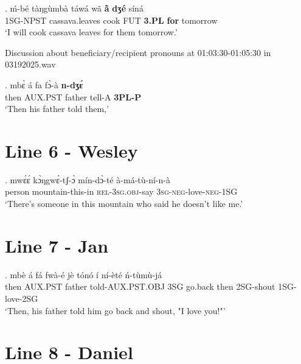 \documentclass{assets/fieldnotes}
\begin{document}
\exg.
ḿ-bé    tàŋgùmbà         táwá   wã    \textbf{à̃ }     \textbf{dʒé}    síná     \\
1SG-NPST   cassava.leaves   cook   FUT   \textbf{3.PL}   \textbf{for}   tomorrow \\
`I will cook cassava leaves for them tomorrow.' \label{3PL beneficiary 2}

Discussion about beneficiary/recipient pronouns at 01:03:30-01:05:30 in 03192025.wav

\exg.
mbɛ̀    á     fa       fɔ̀-à     \textbf{n-dʒɛ́ }\\
then   AUX.PST   father   tell-A   \textbf{3PL-P}  \\%
`Then his father told them,' \label{told them}


\section{Line 6 - Wesley} 

\exg. mwɛ́ɛ́ kɔ̀ŋgwɛ́-tʃ-ɔ̀ mín-dɔ̀-té à-má-tù-ní-n-à\\
person mountain-this-in \textsc{rel}-\textsc{3sg.obj}-say \textsc{3sg}-\textsc{neg}-love-\textsc{neg}-\textsc{1SG}\\
`There's someone in this mountain who said he doesn't like me.'


\section{Line 7 - Jan} 

\exg. mbè á fá fwà-é jè tónó í ní-èté ń-tùmù-já \\
then AUX.PST father told-AUX.PST.OBJ 3SG go.back then 2SG-shout 1SG-love-2SG \\
`Then, his father told him go back and shout, "I love you!"'

\section{Line 8 - Daniel} 
\end{document}

